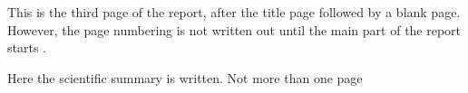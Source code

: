 \documentclass[../main.tex]{subfiles}
\begin{document}
This is the third page of the report, after the title page followed by a blank page. However, the page numbering is not written out until the main part of the report starts \citep{earle_identifying_2016}.

Here the scientific summary is written. Not more than one page \citep{galardini_phenotype_2017}
\end{document}
